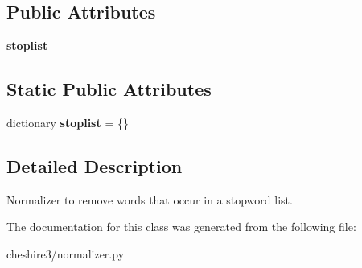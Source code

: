 \subsection*{Public Attributes}
\begin{DoxyCompactItemize}
\item 
\hypertarget{classcheshire3_1_1normalizer_1_1_stoplist_normalizer_a6f11354653132691b59363d57958891d}{{\bfseries stoplist}}\label{classcheshire3_1_1normalizer_1_1_stoplist_normalizer_a6f11354653132691b59363d57958891d}

\end{DoxyCompactItemize}
\subsection*{Static Public Attributes}
\begin{DoxyCompactItemize}
\item 
\hypertarget{classcheshire3_1_1normalizer_1_1_stoplist_normalizer_a410e35c3a518066da04eb615044a770f}{dictionary {\bfseries stoplist} = \{\}}\label{classcheshire3_1_1normalizer_1_1_stoplist_normalizer_a410e35c3a518066da04eb615044a770f}

\end{DoxyCompactItemize}


\subsection{Detailed Description}
\begin{DoxyVerb}Normalizer to remove words that occur in a stopword list.\end{DoxyVerb}
 

The documentation for this class was generated from the following file\-:\begin{DoxyCompactItemize}
\item 
cheshire3/normalizer.\-py\end{DoxyCompactItemize}
